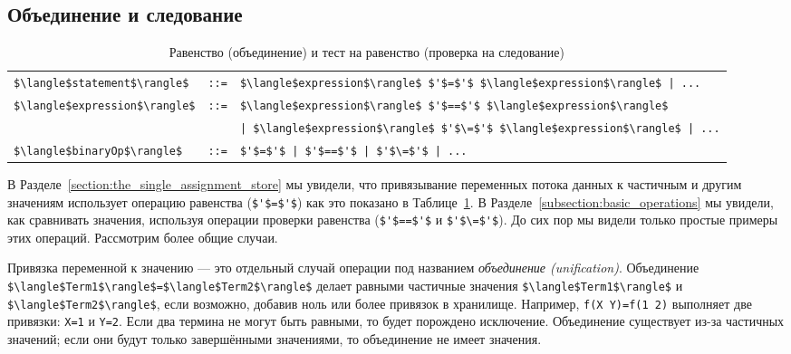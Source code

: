 \subsection{Объединение и следование}

\begin{table}
  \begin{tabular}{|lrl|}
    \hline
    \lstinline!$\langle$statement$\rangle$! & \lstinline!::=! & \lstinline!$\langle$expression$\rangle$ $'$=$'$ $\langle$expression$\rangle$ | ...! \\
    \lstinline!$\langle$expression$\rangle$! & \lstinline!::=! & \lstinline!$\langle$expression$\rangle$ $'$==$'$ $\langle$expression$\rangle$ ! \\
    & & \lstinline!| $\langle$expression$\rangle$ $'$\=$'$ $\langle$expression$\rangle$ | ...! \\
    \lstinline!$\langle$binaryOp$\rangle$! & \lstinline!::=! & \lstinline!$'$=$'$ | $'$==$'$ | $'$\=$'$ | ...! \\
    \hline
  \end{tabular}
\caption{Равенство (объединение) и тест на равенство (проверка на следование)}
\label{table:equality_and_equality_test}
\end{table}



В Разделе~\ref{section:the_single_assignment_store} мы увидели, что привязывание переменных потока данных к частичным и другим значениям использует операцию равенства (\lstinline!$'$=$'$!) как это показано в Таблице~\ref{table:equality_and_equality_test}. В Разделе~\ref{subsection:basic_operations} мы увидели, как сравнивать значения, используя операции проверки равенства (\lstinline!$'$==$'$! и \lstinline!$'$\=$'$!). До сих пор мы видели только простые примеры этих операций. Рассмотрим более общие случаи.

Привязка переменной к значению --- это отдельный случай операции под названием \emph{объединение (unification)}. Объединение \lstinline!$\langle$Term1$\rangle$=$\langle$Term2$\rangle$! делает равными частичные значения \lstinline!$\langle$Term1$\rangle$! и \lstinline!$\langle$Term2$\rangle$!, если возможно, добавив ноль или более привязок в хранилище. Например, \lstinline!f(X Y)=f(1 2)! выполняет две привязки: \lstinline!X=1! и \lstinline!Y=2!. Если два термина не могут быть равными, то будет порождено исключение. Объединение существует из-за частичных значений; если они будут только завершёнными значениями, то объединение не имеет значения.

